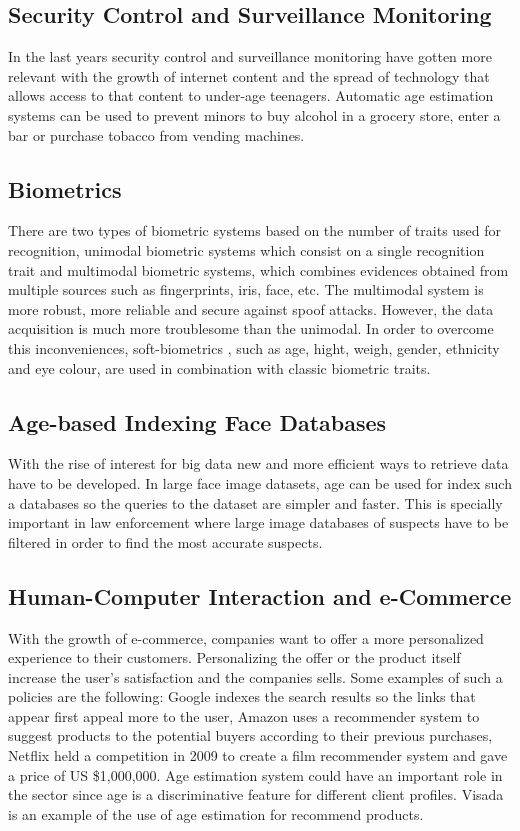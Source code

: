 \subsection{Security Control and Surveillance Monitoring}
In the last years security control and surveillance monitoring have gotten more relevant with the growth of internet content and the spread of technology that allows access to that content to under-age teenagers. Automatic age estimation systems can be used to prevent minors to buy alcohol in a grocery store, enter a bar or purchase tobacco from vending machines.

\subsection{Biometrics}
There are two types of biometric systems based on the number of traits used for recognition, unimodal biometric systems which consist on a single recognition trait and multimodal biometric systems, which combines evidences obtained from multiple sources \cite{MSU-CSE-99-39} such as fingerprints, iris, face, etc. The multimodal system is more robust, more reliable and secure against spoof attacks. However, the data acquisition is much more troublesome than the unimodal. In order to overcome this inconveniences, soft-biometrics \cite{conf/icba/JainDN04}, such as age, hight, weigh, gender, ethnicity and eye colour, are used in combination with classic biometric traits. 

\subsection{Age-based Indexing Face Databases}
With the rise of interest for big data new and more efficient ways to retrieve data have to be developed. In large face image datasets, age can be used for index such a databases so the queries to the dataset are simpler and faster. This is specially important in law enforcement where large image databases of suspects have to be filtered in order to find the most accurate suspects.

\subsection{Human-Computer Interaction and e-Commerce}
With the growth of e-commerce, companies want to offer a more personalized experience to their customers. Personalizing the offer or the product itself increase the user's satisfaction and the companies sells. Some examples of such a policies are the following: Google \cite{Brin:1998:ALH:297810.297827} indexes the search results so the links that appear first appeal more to the user, Amazon \cite{Linden:2003:ARI:642462.642471} uses a recommender system to suggest products to the potential buyers according to their previous purchases, Netflix \cite{Koren:2009:MFT:1608565.1608614} held a competition in 2009 to create a film recommender system and gave a price of US \$1,000,000. Age estimation system could have an important role in the sector since age is a discriminative feature for different client profiles. Visada \cite{visada} is an example of the use of age estimation for recommend products.


